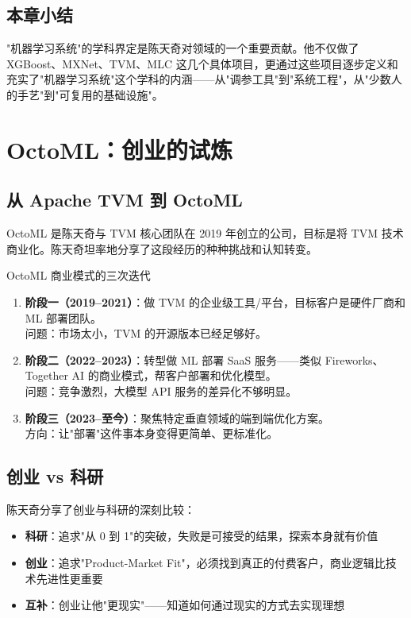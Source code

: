\documentclass[a4paper]{article}
\begin{document}
\subsection{本章小结}

"机器学习系统"的学科界定是陈天奇对领域的一个重要贡献。他不仅做了 XGBoost、MXNet、TVM、MLC 这几个具体项目，更通过这些项目逐步定义和充实了"机器学习系统"这个学科的内涵——从"调参工具"到"系统工程"，从"少数人的手艺"到"可复用的基础设施"。

\section{OctoML：创业的试炼}

\subsection{从 Apache TVM 到 OctoML}

OctoML 是陈天奇与 TVM 核心团队在 2019 年创立的公司，目标是将 TVM 技术商业化。陈天奇坦率地分享了这段经历的种种挑战和认知转变。

\begin{importantbox}{OctoML 商业模式的三次迭代}
\begin{enumerate}
\item \textbf{阶段一（2019--2021）}：做 TVM 的企业级工具/平台，目标客户是硬件厂商和 ML 部署团队。\\问题：市场太小，TVM 的开源版本已经足够好。
\item \textbf{阶段二（2022--2023）}：转型做 ML 部署 SaaS 服务——类似 Fireworks、Together AI 的商业模式，帮客户部署和优化模型。\\问题：竞争激烈，大模型 API 服务的差异化不够明显。
\item \textbf{阶段三（2023--至今）}：聚焦特定垂直领域的端到端优化方案。\\方向：让"部署"这件事本身变得更简单、更标准化。
\end{enumerate}
\end{importantbox}

\subsection{创业 vs 科研}

陈天奇分享了创业与科研的深刻比较：

\begin{itemize}
\item \textbf{科研}：追求"从 0 到 1"的突破，失败是可接受的结果，探索本身就有价值
\item \textbf{创业}：追求"Product-Market Fit"，必须找到真正的付费客户，商业逻辑比技术先进性更重要
\item \textbf{互补}：创业让他"更现实"——知道如何通过现实的方式去实现理想
\end{itemize}
\end{document}
